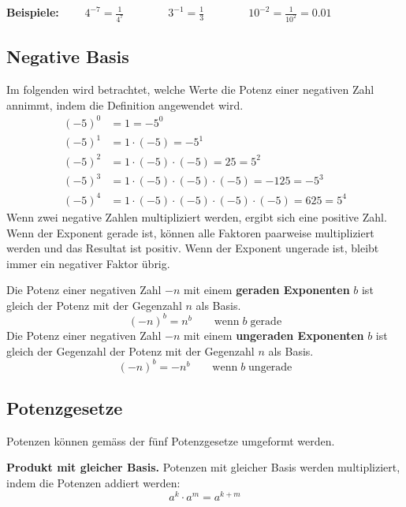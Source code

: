 \begin{example}
  \textbf{Beispiele:} $\displaystyle \qquad 4^{-7} = \frac{1}{4^{7}} \qquad\qquad 3^{-1} = \frac{1}{3} \qquad\qquad 10^{-2} = \frac{1}{10^{2}} = 0.01$
\end{example}

\newpage
\subsection{Negative Basis}

Im folgenden wird betrachtet, welche Werte die Potenz einer negativen Zahl annimmt, indem die Definition angewendet wird.
\begin{align*}
  (-5)^{0} &= 1 = -5^{0} \\
  (-5)^{1} &= 1\cdot(-5) = -5^{1} \\
  (-5)^{2} &= 1\cdot(-5)\cdot(-5) = 25 = 5^{2} \\
  (-5)^{3} &= 1\cdot(-5)\cdot(-5)\cdot(-5) = -125 = -5^{3} \\
  (-5)^{4} &= 1\cdot(-5)\cdot(-5)\cdot(-5)\cdot(-5) = 625 = 5^{4}
\end{align*}
Wenn zwei negative Zahlen multipliziert werden, ergibt sich eine positive Zahl. Wenn der Exponent gerade ist, können alle Faktoren paarweise multipliziert werden und das Resultat ist positiv. Wenn der Exponent ungerade ist, bleibt immer ein negativer Faktor übrig.

\begin{theorem}
  Die Potenz einer negativen Zahl $-n$ mit einem \textbf{geraden Exponenten} $b$ ist gleich der Potenz mit der Gegenzahl $n$ als Basis.
  \[
    (-n)^{b} = n^{b} \qquad \text{wenn}\;b\;\text{gerade}
  \]
  Die Potenz einer negativen Zahl $-n$ mit einem \textbf{ungeraden Exponenten} $b$ ist gleich der Gegenzahl der Potenz mit der Gegenzahl $n$ als Basis.
  \[
    (-n)^{b} = -n^{b} \qquad \text{wenn}\;b\;\text{ungerade}
  \]
\end{theorem}

\subsection{Potenzgesetze}

Potenzen können gemäss der fünf Potenzgesetze umgeformt werden.

\begin{theorem}
  \textbf{Produkt mit gleicher Basis.} Potenzen mit gleicher Basis werden multipliziert, indem die Potenzen addiert werden:
  \[
    a^{k} \cdot a^{m} = a^{k+m}
  \]
\end{theorem}

